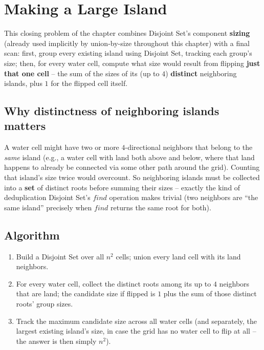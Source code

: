 \section{Making a Large Island}
\label{sec:graph-making-large-island}


\begin{patternbox}
This closing problem of the chapter combines Disjoint Set's component
\textbf{sizing} (already used implicitly by union-by-size throughout
this chapter) with a final scan: first, group every existing island
using Disjoint Set, tracking each group's size; then, for every water
cell, compute what size would result from flipping \textbf{just that
one cell} -- the sum of the sizes of its (up to $4$) \textbf{distinct}
neighboring islands, plus $1$ for the flipped cell itself.
\end{patternbox}

\subsection*{Why distinctness of neighboring islands matters}

A water cell might have two or more $4$-directional neighbors that
belong to the \emph{same} island (e.g., a water cell with land both
above and below, where that land happens to already be connected via
some other path around the grid). Counting that island's size twice
would overcount. So neighboring islands must be collected into a
\textbf{set} of distinct roots before summing their sizes -- exactly
the kind of deduplication Disjoint Set's $\textit{find}$ operation
makes trivial (two neighbors are ``the same island'' precisely when
$\textit{find}$ returns the same root for both).

\subsection*{Algorithm}

\begin{enumerate}
  \item Build a Disjoint Set over all $n^2$ cells; union every land
        cell with its land neighbors.
  \item For every water cell, collect the distinct roots among its up
        to $4$ neighbors that are land; the candidate size if flipped
        is $1$ plus the sum of those distinct roots' group sizes.
  \item Track the maximum candidate size across all water cells (and
        separately, the largest existing island's size, in case the
        grid has no water cell to flip at all -- the answer is then
        simply $n^2$).
\end{enumerate}

